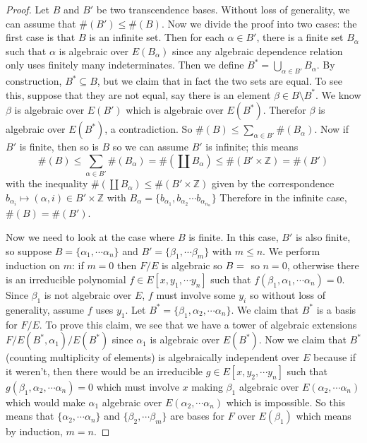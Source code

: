 \begin{proof} 
Let $B$ and $B'$ be two transcendence bases. Without loss of generality, we can
assume that $\#(B')\leq \#(B)$. Now we divide the proof into two cases: the
first case is that $B$ is an infinite set. Then for each $\alpha\in B'$, there
is a finite set $B_{\alpha}$ such that $\alpha$ is algebraic over
$E(B_{\alpha})$ since any algebraic dependence relation only uses finitely many
indeterminates. Then we define $B^*=\bigcup_{\alpha\in B'} B_{\alpha}$. By
construction, $B^*\subseteq B$, but we claim that in fact the two sets are
equal. To see this, suppose that they are not equal, say there is an element
$\beta\in B\setminus B^*$. We know $\beta$ is algebraic over $E(B')$ which is
algebraic over $E(B^*)$. Therefor $\beta$ is algebraic over $E(B^*)$, a
contradiction. So $\#(B)\leq \sum_{\alpha\in B'} \#(B_{\alpha})$. Now if $B'$ is
finite, then so is $B$ so we can assume $B'$ is infinite; this means
\begin{equation} \#(B)\leq \sum_{\alpha\in B'}\#(B_{\alpha})=\#(\coprod
B_{\alpha})\leq \#(B'\times\mathbb{Z})=\#(B')\end{equation} with the inequality $\#(\coprod
B_{\alpha}) \leq \#(B'\times \mathbb{Z})$ given by the correspondence
$b_{\alpha_i}\mapsto (\alpha,i)\in B'\times \mathbb{Z}$ with $B_\alpha =
\{b_{\alpha_1},b_{\alpha_2}\cdots b_{\alpha_{n_\alpha}}\}$ Therefore in the
infinite case, $\#(B)=\#(B')$.

Now we need to look at the case where $B$ is finite. In this case, $B'$ is also
finite, so suppose $B=\{\alpha_1,\cdots\alpha_n\}$ and
$B'=\{\beta_1,\cdots\beta_m\}$ with $m\leq n$. We perform induction on $m$: if
$m=0$ then $F/E$ is algebraic so $B=\null$ so $n=0$, otherwise there is an
irreducible polynomial $f\in E[x,y_1,\cdots y_n]$ such that
$f(\beta_1,\alpha_1,\cdots \alpha_n) = 0$. Since $\beta_1$ is not algebraic over
$E$, $f$ must involve some $y_i$ so without loss of generality, assume $f$ uses
$y_1$. Let $B^*=\{\beta_1,\alpha_2,\cdots\alpha_n\}$. We claim that $B^*$ is a
basis for $F/E$. To prove this claim, we see that we have a tower of algebraic
extensions $F/E(B^*,\alpha_1)/E(B^*)$ since $\alpha_1$ is algebraic over
$E(B^*)$. Now we claim that $B^*$ (counting multiplicity of elements) is
algebraically independent over $E$ because if it weren't, then there would be an
irreducible $g\in E[x,y_2,\cdots y_n]$ such that
$g(\beta_1,\alpha_2,\cdots\alpha_n)=0$ which must involve $x$ making $\beta_1$
algebraic over $E(\alpha_2,\cdots \alpha_n)$ which would make $\alpha_1$
algebraic over $E(\alpha_2,\cdots \alpha_n)$ which is impossible. So this means
that $\{\alpha_2,\cdots\alpha_n\}$ and $\{\beta_2,\cdots\beta_m\}$ are bases for
$F$ over $E(\beta_1)$ which means by induction, $m=n$. \end{proof}

